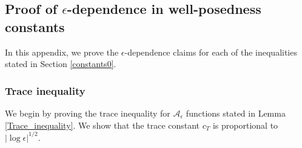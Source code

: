 \documentclass[11pt]{article}
\numberwithin{equation}{section}
\newcommand{\A}{\mathcal{A}}
\newcommand{\abs}[1]{\left\lvert #1 \right\rvert}
\theoremstyle{definition}
\begin{document}
\subsection{Proof of $\epsilon$-dependence in well-posedness constants}\label{constants}
In this appendix, we prove the $\epsilon$-dependence claims for each of the inequalities stated in Section \ref{constants0}.

\subsubsection{Trace inequality}\label{trace_sec}
We begin by proving the trace inequality for $\A_\epsilon$ functions stated in Lemma \ref{Trace_inequality}. We show that the trace constant $c_T$ is proportional to $\abs{\log\epsilon}^{1/2}$. 
\end{document}
